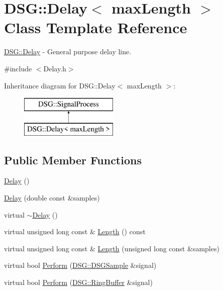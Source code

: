 \hypertarget{class_d_s_g_1_1_delay}{\section{D\+S\+G\+:\+:Delay$<$ max\+Length $>$ Class Template Reference}
\label{class_d_s_g_1_1_delay}
}


\hyperlink{class_d_s_g_1_1_delay}{D\+S\+G\+::\+Delay} -\/ General purpose delay line.  




{\ttfamily \#include $<$Delay.\+h$>$}

Inheritance diagram for D\+S\+G\+:\+:Delay$<$ max\+Length $>$\+:\begin{figure}[H]
\begin{center}
\leavevmode
\includegraphics[height=2.000000cm]{class_d_s_g_1_1_delay}
\end{center}
\end{figure}
\subsection*{Public Member Functions}
\begin{DoxyCompactItemize}
\item 
\hyperlink{class_d_s_g_1_1_delay_a20fb108695dac24156aeb2143a88555a}{Delay} ()
\item 
\hyperlink{class_d_s_g_1_1_delay_aecfa312690df905bbeaa8888d1bb702f}{Delay} (double const \&samples)
\item 
virtual \hyperlink{class_d_s_g_1_1_delay_ac2df9a0120744cc8efa15556e4293a2c}{$\sim$\+Delay} ()
\item 
virtual unsigned long const \& \hyperlink{class_d_s_g_1_1_delay_abf8bfbd184f1e733d1b5aae0bfa408d7}{Length} () const 
\item 
virtual unsigned long const \& \hyperlink{class_d_s_g_1_1_delay_a7081f684727044ff1765ab6284385359}{Length} (unsigned long const \&samples)
\item 
virtual bool \hyperlink{class_d_s_g_1_1_delay_afe853b73a1d7d1e5720277e5d956b209}{Perform} (\hyperlink{namespace_d_s_g_ac39a94cd27ebcd9c1e7502d0c624894a}{D\+S\+G\+::\+D\+S\+G\+Sample} \&signal)
\item 
virtual bool \hyperlink{class_d_s_g_1_1_delay_a205bd6fc25ea951395943eae51128e66}{Perform} (\hyperlink{class_d_s_g_1_1_ring_buffer}{D\+S\+G\+::\+Ring\+Buffer} \&signal)
\end{DoxyCompactItemize}
